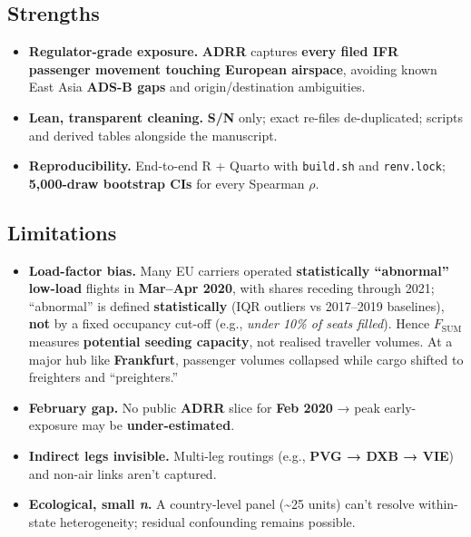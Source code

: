 \documentclass[
  authoryear,
  preprint,
  3p,
  onecolumn]{elsarticle}
\providecommand{\tightlist}{%
  \setlength{\itemsep}{0pt}\setlength{\parskip}{0pt}}\usepackage{longtable,booktabs,array}
\begin{document}
\subsection{Strengths}\label{strengths}

\begin{itemize}
\tightlist
\item
  \textbf{Regulator-grade exposure.} \textbf{ADRR} captures
  \textbf{every filed IFR passenger movement touching European
  airspace}, avoiding known East Asia \textbf{ADS-B gaps} and
  origin/destination ambiguities. \citep{strohmeier2021}
\item
  \textbf{Lean, transparent cleaning.} \textbf{S/N} only; exact re-files
  de-duplicated; scripts and derived tables alongside the manuscript.
  \citep{eurocontrol2022seg}
\item
  \textbf{Reproducibility.} End-to-end R + Quarto with \texttt{build.sh}
  and \texttt{renv.lock}; \textbf{5,000-draw bootstrap CIs} for every
  Spearman \(\rho\).
\end{itemize}

\subsection{Limitations}\label{limitations}

\begin{itemize}
\tightlist
\item
  \textbf{Load-factor bias.} Many EU carriers operated
  \textbf{statistically ``abnormal'' low-load} flights in
  \textbf{Mar--Apr 2020}, with shares receding through 2021;
  ``abnormal'' is defined \textbf{statistically} (IQR outliers vs
  2017--2019 baselines), \textbf{not} by a fixed occupancy cut-off
  (e.g., \emph{under 10\% of seats filled}). Hence \(F_{\text{SUM}}\)
  measures \textbf{potential seeding capacity}, not realised traveller
  volumes. \citep{sun2022_b} At a major hub like \textbf{Frankfurt},
  passenger volumes collapsed while cargo shifted to freighters and
  ``preighters.'' \citep{fraport2021}
\item
  \textbf{February gap.} No public \textbf{ADRR} slice for \textbf{Feb
  2020} → peak early-exposure may be \textbf{under-estimated}.
\item
  \textbf{Indirect legs invisible.} Multi-leg routings (e.g.,
  \textbf{PVG → DXB → VIE}) and non-air links aren't captured.
\item
  \textbf{Ecological, small \emph{n}.} A country-level panel
  (\textasciitilde25 units) can't resolve within-state heterogeneity;
  residual confounding remains possible.
\end{itemize}
\end{document}
